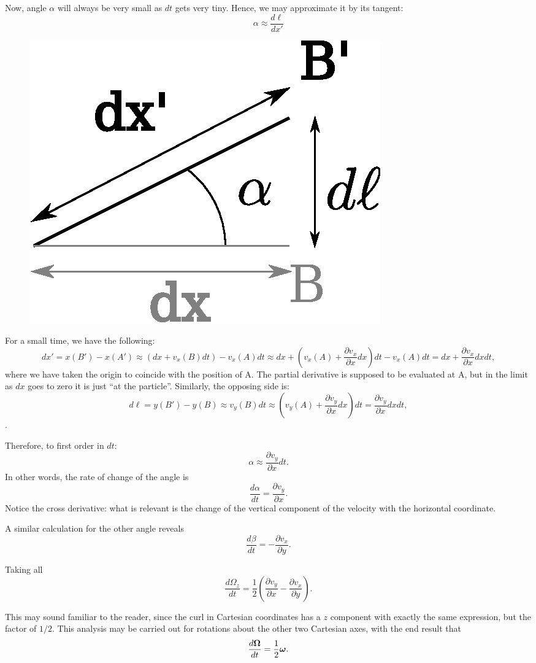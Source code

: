 Now, angle $\alpha$ will always be very small as $dt$ gets very
tiny. Hence, we may approximate it by its tangent:
\[
\alpha \approx \frac{d\ell}{dx'}
\]



\begin{figure}
  \centering
  \includegraphics[width=0.4\linewidth]{figures/particle1}
  \caption{\label{fig:particle1}}
\end{figure}

For a small time, we have the following:
\[
dx'=x(B')-x(A') \approx
(dx+v_x(B) dt) - v_x(A) dt \approx
dx+
\left(
v_x(A) +
\frac{\partial v_x}{\partial x} dx
\right ) dt - v_x(A) dt = dx + \frac{\partial v_x}{\partial x} dx dt ,
\]
where we have taken the origin to coincide with the position of A. The
partial derivative is supposed to be evaluated at A, but in the limit
as $dx$ goes to zero it is just ``at the particle''. Similarly, the opposing
side is:
\[ 
d\ell = y(B')-y(B) \approx
v_y(B) dt \approx
\left(
v_y(A) +
\frac{\partial v_y}{\partial x} dx
\right ) dt = \frac{\partial v_y}{\partial x} dx dt ,
\].

Therefore, to first order in $dt$:
\[
\alpha \approx \frac{\partial v_y}{\partial x}  dt .
\]
In other words, the rate of change of the angle is
\[
\frac{d \alpha}{dt} = \frac{\partial v_y}{\partial x}  .
\]
Notice the cross derivative: what is relevant is the change of the
vertical component of the velocity with the horizontal coordinate.

A similar calculation for the other angle reveals
\[
\frac{d \beta}{dt} = - \frac{\partial v_x}{\partial y}  .
\]

Taking all
\[
\frac{d\Omega_z}{dt} = \frac12
\left(
  \frac{\partial v_y}{\partial x}  -
  \frac{\partial v_x}{\partial y}
\right) .
\]

This may sound familiar to the reader, since the curl in Cartesian
coordinates has a $z$ component with exactly the same expression, but
the factor of $1/2$. This analysis may be carried out for
rotations about the other two Cartesian axes, with the end result that
\[
 \frac{d \bm{\Omega} }{dt} = \frac12 \bm{\omega} .
\]

